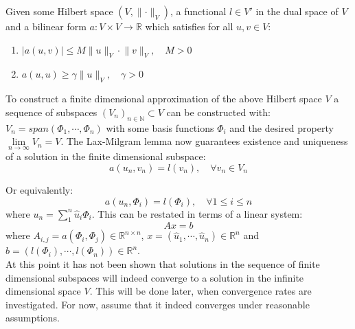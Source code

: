 \documentclass[11pt,a4paper]{article}
\begin{document}
Given some Hilbert space $\left(V, \lVert \cdot \rVert_V\right)$, a functional
$l\in V'$ in the dual space of $V$ and a bilinear form $a: V \times V
\rightarrow \mathbb{R}$ which satisfies for all $u,v\in V$:
\begin{enumerate}
  \item $|a(u,v)| \leq M \lVert u \rVert_V \cdot \lVert v \rVert_V, \quad M > 0$
  \item $a(u,u) \geq \gamma \lVert u \rVert_V, \quad \gamma > 0$
\end{enumerate}


To construct a finite dimensional approximation of the above Hilbert space $V$
a sequence of subspaces $(V_n)_{n\in\mathbb{N}} \subset V$ can be constructed with:
$V_n = span(\Phi_1,\dotsb, \Phi_n)$ with some basis functions $\Phi_i$ and the
desired property $\lim\limits_{n\to \infty} V_n = V$.
The Lax-Milgram lemma now guarantees existence and uniqueness of a solution in
the finite dimensional subspace:
\begin{equation}
  a(u_n, v_n) = l(v_n), \quad \forall v_n \in V_n
\end{equation}

Or equivalently:
\begin{equation}
  a(u_n, \Phi_i) = l(\Phi_i), \quad \forall 1 \le i \le n
\end{equation}
where $u_n = \sum^n_1 \hat{u}_i\Phi_i$. This can be restated in terms of a
linear system:
$$Ax=b$$
where $A_{i,j} = a(\Phi_i, \Phi_j) \in \mathbb{R}^{n\times n}$,
$x = \left(\hat{u}_1, \dotsb, \hat{u}_n\right) \in \mathbb{R}^n$ and
$b = (l(\Phi_i), \dotsb, l(\Phi_n)) \in \mathbb{R}^n$.\\
At this point it has not been shown that solutions in the sequence of finite
dimensional subspaces will indeed converge to a solution in the infinite
dimensional space $V$. This will be done later, when convergence rates are
investigated. For now, assume that it indeed converges under reasonable
assumptions.
\end{document}
